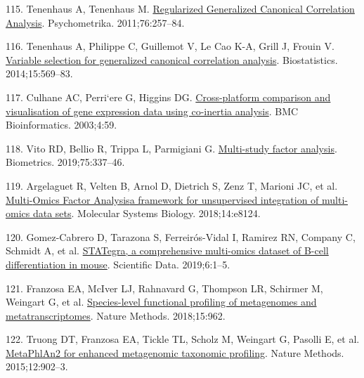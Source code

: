 \documentclass[
  12pt,
  a4paper,
  twoside,
  openright]{book}
\newlength{\cslhangindent}
\newlength{\cslentryspacingunit} %
\newenvironment{CSLReferences}[2] %
 {%
  \setlength{\parindent}{0pt}
  \ifodd #1
  \let\oldpar\par
  \def\par{\hangindent=\cslhangindent\oldpar}
  \fi
  \setlength{\parskip}{#2\cslentryspacingunit}
 }%
 {}
\begin{document}
\begin{CSLReferences}{0}{0}
\leavevmode{}%
115. Tenenhaus A, Tenenhaus M. \href{https://doi.org/10.1007/s11336-011-9206-8}{Regularized {Generalized Canonical Correlation Analysis}}. Psychometrika. 2011;76:257--84.

\leavevmode{}%
116. Tenenhaus A, Philippe C, Guillemot V, Le Cao K-A, Grill J, Frouin V. \href{https://doi.org/10.1093/biostatistics/kxu001}{Variable selection for generalized canonical correlation analysis}. Biostatistics. 2014;15:569--83.

\leavevmode{}%
117. Culhane AC, Perri`ere G, Higgins DG. \href{https://doi.org/10.1186/1471-2105-4-59}{Cross-platform comparison and visualisation of gene expression data using co-inertia analysis}. BMC Bioinformatics. 2003;4:59.

\leavevmode{}%
118. Vito RD, Bellio R, Trippa L, Parmigiani G. \href{https://doi.org/10.1111/biom.12974}{Multi-study factor analysis}. Biometrics. 2019;75:337--46.

\leavevmode{}%
119. Argelaguet R, Velten B, Arnol D, Dietrich S, Zenz T, Marioni JC, et al. \href{https://doi.org/10.15252/msb.20178124}{Multi-{Omics Factor Analysis}\textemdash{}a framework for unsupervised integration of multi-omics data sets}. Molecular Systems Biology. 2018;14:e8124.

\leavevmode{}%
120. Gomez-Cabrero D, Tarazona S, Ferreirós-Vidal I, Ramirez RN, Company C, Schmidt A, et al. \href{https://doi.org/10.1038/s41597-019-0202-7}{STATegra, a comprehensive multi-omics dataset of B-cell differentiation in mouse}. Scientific Data. 2019;6:1--5.

\leavevmode{}%
121. Franzosa EA, McIver LJ, Rahnavard G, Thompson LR, Schirmer M, Weingart G, et al. \href{https://doi.org/10.1038/s41592-018-0176-y}{Species-level functional profiling of metagenomes and metatranscriptomes}. Nature Methods. 2018;15:962.

\leavevmode{}%
122. Truong DT, Franzosa EA, Tickle TL, Scholz M, Weingart G, Pasolli E, et al. \href{https://doi.org/10.1038/nmeth.3589}{MetaPhlAn2 for enhanced metagenomic taxonomic profiling}. Nature Methods. 2015;12:902--3.


\end{CSLReferences}
\end{document}
